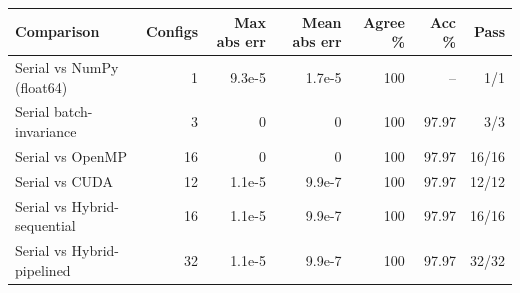 \begin{tabular}{lrrrrrr}
\toprule
Comparison & Configs & Max abs err & Mean abs err & Agree \% & Acc \% & Pass \\
\midrule
Serial vs NumPy (float64) & 1 & 9.3e-5 & 1.7e-5 & 100 & -- & 1/1 \\
Serial batch-invariance & 3 & 0 & 0 & 100 & 97.97 & 3/3 \\
Serial vs OpenMP & 16 & 0 & 0 & 100 & 97.97 & 16/16 \\
Serial vs CUDA & 12 & 1.1e-5 & 9.9e-7 & 100 & 97.97 & 12/12 \\
Serial vs Hybrid-sequential & 16 & 1.1e-5 & 9.9e-7 & 100 & 97.97 & 16/16 \\
Serial vs Hybrid-pipelined & 32 & 1.1e-5 & 9.9e-7 & 100 & 97.97 & 32/32 \\
\bottomrule
\end{tabular}
